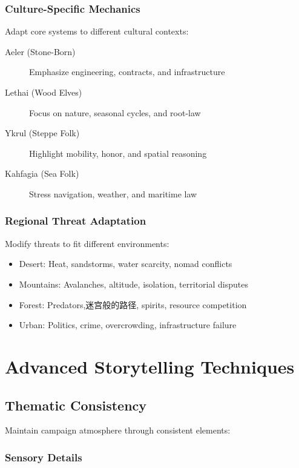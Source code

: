 \documentclass[11pt]{article}
\begin{document}
\subsubsection{Culture-Specific Mechanics}

Adapt core systems to different cultural contexts:

\begin{description}
  \item[Aeler (Stone-Born)] Emphasize engineering, contracts, and infrastructure
  \item[Lethai (Wood Elves)] Focus on nature, seasonal cycles, and root-law
  \item[Ykrul (Steppe Folk)] Highlight mobility, honor, and spatial reasoning
  \item[Kahfagia (Sea Folk)] Stress navigation, weather, and maritime law
\end{description}

\subsubsection{Regional Threat Adaptation}

Modify threats to fit different environments:

\begin{itemize}
  \item Desert: Heat, sandstorms, water scarcity, nomad conflicts
  \item Mountains: Avalanches, altitude, isolation, territorial disputes
  \item Forest: Predators,迷宫般的路径, spirits, resource competition
  \item Urban: Politics, crime, overcrowding, infrastructure failure
\end{itemize}

\section{Advanced Storytelling Techniques}

\subsection{Thematic Consistency}

Maintain campaign atmosphere through consistent elements:

\subsubsection{Sensory Details}
\end{document}
